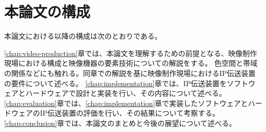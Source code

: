 
\section{本論文の構成}
本論文における以降の構成は次のとおりである。

\ref{chap:video-production}章では、本論文を理解するための前提となる、映像制作現場における構成と映像機器の要素技術についての解説をする。
色空間と帯域の関係などにも触れる。同章での解説を基に映像制作現場におけるIP伝送装置の要件について述べる。
\ref{chap:implementation}章では、IP伝送装置をソフトウェアとハードウェアで設計と実装を行い、その内容について述べる。 %
\ref{chap:evaluation}章では、\ref{chap:implementation}章で実装したソフトウェアとハードウェアのIP伝送装置の評価を行い、その結果について考察する。
\ref{chap:conclusion}章では、本論文のまとめと今後の展望について述べる。

